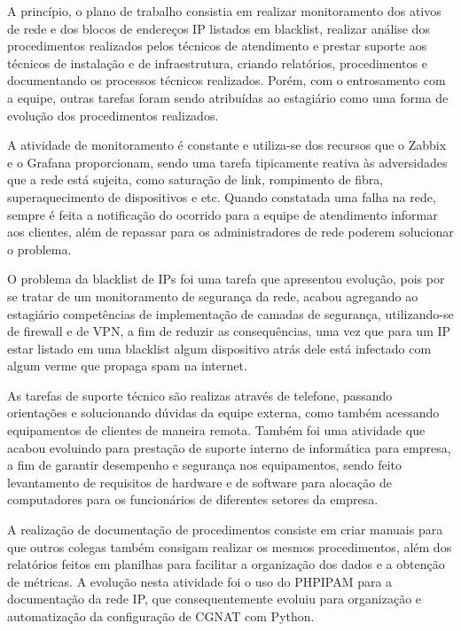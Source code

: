     A princípio, o plano de trabalho consistia em realizar monitoramento dos ativos de rede e dos blocos de endereços IP listados em blacklist, realizar análise dos procedimentos realizados pelos técnicos de atendimento e prestar suporte aos técnicos de instalação e de infraestrutura, criando relatórios, procedimentos e documentando os processos técnicos realizados. Porém, com o entrosamento com a equipe, outras tarefas foram sendo atribuídas ao estagiário como uma forma de evolução dos procedimentos realizados.
    
    A atividade de monitoramento é constante e utiliza-se dos recursos que o Zabbix e o Grafana proporcionam, sendo uma tarefa tipicamente reativa às adversidades que a rede está sujeita, como saturação de link, rompimento de fibra, superaquecimento de dispositivos e etc. Quando constatada uma falha na rede, sempre é feita a notificação do ocorrido para a equipe de atendimento informar aos clientes, além de repassar para os administradores de rede poderem solucionar o problema.
    
    O problema da blacklist de IPs foi uma tarefa que apresentou evolução, pois por se tratar de um monitoramento de segurança da rede, acabou agregando ao estagiário competências de implementação de camadas de segurança, utilizando-se de firewall e de VPN, a fim de reduzir as consequências, uma vez que para um IP estar listado em uma blacklist algum dispositivo atrás dele está infectado com algum verme que propaga spam na internet.
    
    As tarefas de suporte técnico são realizas através de telefone, passando orientações e solucionando dúvidas da equipe externa, como também acessando equipamentos de clientes de maneira remota. Também foi uma atividade que acabou evoluindo para prestação de suporte interno de informática para empresa, a fim de garantir desempenho e segurança nos equipamentos, sendo feito levantamento de requisitos de hardware e de software para alocação de computadores para os funcionários de diferentes setores da empresa.
    
    A realização de documentação de procedimentos consiste em criar manuais para que outros colegas também consigam realizar os mesmos procedimentos, além dos relatórios feitos em planilhas para facilitar a organização dos dados e a obtenção de métricas. A evolução nesta atividade foi o uso do PHPIPAM para a documentação da rede IP, que consequentemente evoluiu para organização e automatização da configuração de CGNAT com Python.
    
